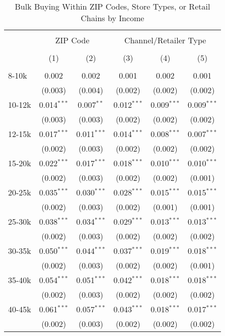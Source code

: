 \begin{table}[!htbp] \centering
  \caption{Bulk Buying Within ZIP Codes, Store Types, or Retail Chains by Income}
  \label{tab:discountingBehaviorFEAll}
\begin{tabular}{@{\extracolsep{5pt}}lccccc}
\\[-1.8ex]\hline
\hline \\[-1.8ex]
 & \multicolumn{2}{c}{ZIP Code} & \multicolumn{3}{c}{Channel/Retailer Type} \\
\\[-1.8ex] & (1) & (2) & (3) & (4) & (5)\\
\hline \\[-1.8ex]
 8-10k & 0.002 & 0.002 & 0.001 & 0.002 & 0.001 \\
  & (0.003) & (0.004) & (0.002) & (0.002) & (0.002) \\
  10-12k & 0.014$^{***}$ & 0.007$^{**}$ & 0.012$^{***}$ & 0.009$^{***}$ & 0.009$^{***}$ \\
  & (0.003) & (0.003) & (0.002) & (0.002) & (0.002) \\
  12-15k & 0.017$^{***}$ & 0.011$^{***}$ & 0.014$^{***}$ & 0.008$^{***}$ & 0.007$^{***}$ \\
  & (0.002) & (0.003) & (0.002) & (0.002) & (0.002) \\
  15-20k & 0.022$^{***}$ & 0.017$^{***}$ & 0.018$^{***}$ & 0.010$^{***}$ & 0.010$^{***}$ \\
  & (0.002) & (0.003) & (0.002) & (0.002) & (0.001) \\
  20-25k & 0.035$^{***}$ & 0.030$^{***}$ & 0.028$^{***}$ & 0.015$^{***}$ & 0.015$^{***}$ \\
  & (0.002) & (0.003) & (0.002) & (0.001) & (0.001) \\
  25-30k & 0.038$^{***}$ & 0.034$^{***}$ & 0.029$^{***}$ & 0.013$^{***}$ & 0.013$^{***}$ \\
  & (0.002) & (0.003) & (0.002) & (0.002) & (0.002) \\
  30-35k & 0.050$^{***}$ & 0.044$^{***}$ & 0.037$^{***}$ & 0.019$^{***}$ & 0.018$^{***}$ \\
  & (0.002) & (0.003) & (0.002) & (0.002) & (0.001) \\
  35-40k & 0.054$^{***}$ & 0.051$^{***}$ & 0.042$^{***}$ & 0.018$^{***}$ & 0.018$^{***}$ \\
  & (0.002) & (0.003) & (0.002) & (0.002) & (0.002) \\
  40-45k & 0.061$^{***}$ & 0.057$^{***}$ & 0.043$^{***}$ & 0.018$^{***}$ & 0.017$^{***}$ \\
  & (0.002) & (0.003) & (0.002) & (0.002) & (0.002) \\

\end{tabular}
\end{table}
